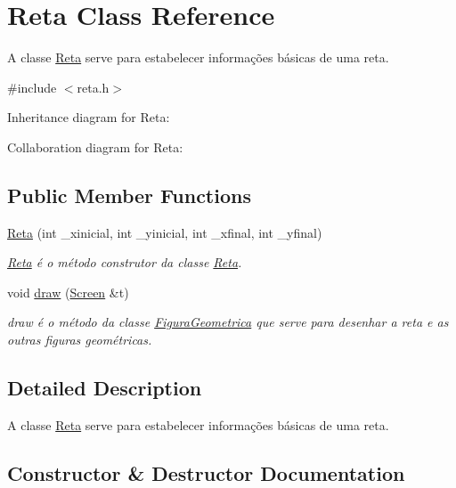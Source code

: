 \hypertarget{classReta}{}\section{Reta Class Reference}
\label{classReta}


A classe \hyperlink{classReta}{Reta} serve para estabelecer informações básicas de uma reta.  




{\ttfamily \#include $<$reta.\+h$>$}



Inheritance diagram for Reta\+:


Collaboration diagram for Reta\+:
\subsection*{Public Member Functions}
\begin{DoxyCompactItemize}
\item 
\hyperlink{classReta_a86dbdfa4259e8c4353c6e2e59731804c}{Reta} (int \+\_\+xinicial, int \+\_\+yinicial, int \+\_\+xfinal, int \+\_\+yfinal)
\begin{DoxyCompactList}\small\item\em \hyperlink{classReta}{Reta} é o método construtor da classe \hyperlink{classReta}{Reta}. \end{DoxyCompactList}\item 
void \hyperlink{classReta_ac2e9805183cd474b62bffd8b032cd780}{draw} (\hyperlink{classScreen}{Screen} \&t)
\begin{DoxyCompactList}\small\item\em draw é o método da classe \hyperlink{classFiguraGeometrica}{Figura\+Geometrica} que serve para desenhar a reta e as outras figuras geométricas. \end{DoxyCompactList}\end{DoxyCompactItemize}


\subsection{Detailed Description}
A classe \hyperlink{classReta}{Reta} serve para estabelecer informações básicas de uma reta. 

\subsection{Constructor \& Destructor Documentation}
\mbox{\label{classReta_a86dbdfa4259e8c4353c6e2e59731804c}} 
